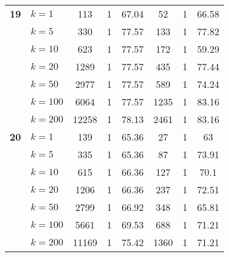 \begin{table}[htbp]
\begin{tabular}{|l|l|c|c|c|c|c|c|}
    \multicolumn{1}{|r|}{\textbf{19}} & $k=1$ & 113 & 1 & 67.04 & 52 & 1 & 66.58 \\ 
     & $k=5$ & 330 & 1 & 77.57 & 133 & 1 & 77.82 \\ 
     & $k=10$ & 623 & 1 & 77.57 & 172 & 1 & 59.29 \\ 
     & $k=20$ & 1289 & 1 & 77.57 & 435 & 1 & 77.44 \\ 
     & $k=50$ & 2977 & 1 & 77.57 & 589 & 1 & 74.24 \\ 
     & $k=100$ & 6064 & 1 & 77.57 & 1235 & 1 & 83.16 \\ 
     & $k=200$ & 12258 & 1 & 78.13 & 2461 & 1 & 83.16 \\ \hline
    \multicolumn{1}{|r|}{\textbf{20}} & $k=1$ & 139 & 1 & 65.36 & 27 & 1 & 63 \\ 
     & $k=5$ & 335 & 1 & 65.36 & 87 & 1 & 73.91 \\ 
     & $k=10$ & 615 & 1 & 66.36 & 127 & 1 & 70.1 \\ 
     & $k=20$ & 1206 & 1 & 66.36 & 237 & 1 & 72.51 \\ 
     & $k=50$ & 2799 & 1 & 66.92 & 348 & 1 & 65.81 \\ 
     & $k=100$ & 5661 & 1 & 69.53 & 688 & 1 & 71.21 \\ 
     & $k=200$ & 11169 & 1 & 75.42 & 1360 & 1 & 71.21 \\ \hline
    \end{tabular}
\end{table}
